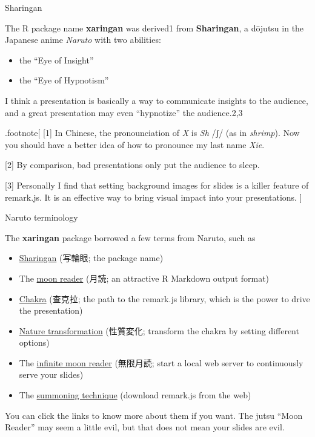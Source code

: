 \documentclass[ignorenonframetext,]{beamer}
\begin{document}
\begin{frame}{Sharingan}
\protect\hypertarget{sharingan}{}

The R package name \textbf{xaringan} was derived1 from
\textbf{Sharingan}, a dōjutsu in the Japanese anime \emph{Naruto} with
two abilities:

\begin{itemize}
\item
  the ``Eye of Insight''
\item
  the ``Eye of Hypnotism''
\end{itemize}

I think a presentation is basically a way to communicate insights to the
audience, and a great presentation may even ``hypnotize'' the
audience.2,3

.footnote{[} {[}1{]} In Chinese, the pronounciation of \emph{X} is
\emph{Sh} /ʃ/ (as in \emph{shrimp}). Now you should have a better idea
of how to pronounce my last name \emph{Xie}.

{[}2{]} By comparison, bad presentations only put the audience to sleep.

{[}3{]} Personally I find that setting background images for slides is a
killer feature of remark.js. It is an effective way to bring visual
impact into your presentations. {]}

\end{frame}

\begin{frame}{Naruto terminology}
\protect\hypertarget{naruto-terminology}{}

The \textbf{xaringan} package borrowed a few terms from Naruto, such as

\begin{itemize}
\item
  \href{http://naruto.wikia.com/wiki/Sharingan}{Sharingan} (写輪眼; the
  package name)
\item
  The \href{http://naruto.wikia.com/wiki/Moon_Reader}{moon reader}
  (月読; an attractive R Markdown output format)
\item
  \href{http://naruto.wikia.com/wiki/Chakra}{Chakra} (查克拉; the path
  to the remark.js library, which is the power to drive the
  presentation)
\item
  \href{http://naruto.wikia.com/wiki/Nature_Transformation}{Nature
  transformation} (性質変化; transform the chakra by setting different
  options)
\item
  The \href{http://naruto.wikia.com/wiki/Infinite_Tsukuyomi}{infinite
  moon reader} (無限月読; start a local web server to continuously serve
  your slides)
\item
  The \href{http://naruto.wikia.com/wiki/Summoning_Technique}{summoning
  technique} (download remark.js from the web)
\end{itemize}

You can click the links to know more about them if you want. The jutsu
``Moon Reader'' may seem a little evil, but that does not mean your
slides are evil.

\end{frame}
\end{document}

